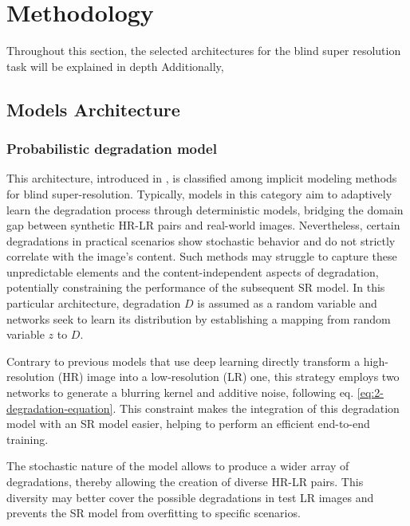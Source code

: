 \section{Methodology} \label{sec:methodology}

Throughout this section, the selected architectures for the blind super resolution task will be explained in depth Additionally, 


\subsection{Models Architecture}

\subsubsection{Probabilistic degradation model}

    This architecture, introduced in \cite{luo2022learning}, is classified among implicit modeling methods for blind super-resolution.
    Typically, models in this category aim to adaptively learn the degradation process through deterministic models, bridging the domain gap between synthetic HR-LR pairs and real-world images.
    Nevertheless, certain degradations in practical scenarios show stochastic behavior and do not strictly correlate with the image's content. Such methods may struggle to capture these unpredictable elements and the content-independent aspects of degradation, potentially constraining the performance of the subsequent SR model. In this particular architecture, degradation \(D\) is assumed as a random variable and networks seek to learn its distribution by establishing a mapping from random variable \(z\) to \(D\). 

    Contrary to previous models that use deep learning directly transform a high-resolution (HR) image into a low-resolution (LR) one, this strategy employs two networks to generate a blurring kernel and additive noise, following eq. \ref{eq:2-degradation-equation}. This constraint makes the integration of this degradation model with an SR model easier, helping to perform an efficient end-to-end training. 
    
    The stochastic nature of the model allows to produce a wider array of degradations, thereby allowing the creation of diverse HR-LR pairs. This diversity may better cover the possible degradations in test LR images and prevents the SR model from overfitting to specific scenarios.


    
